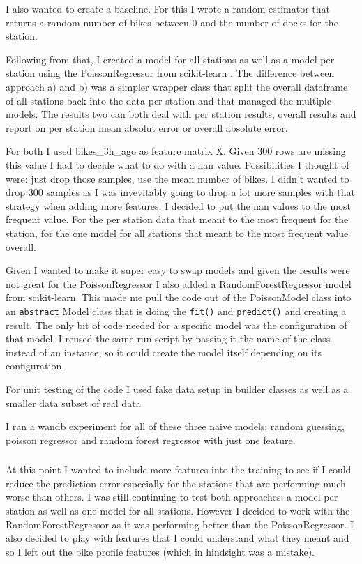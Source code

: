 \documentclass[a4paper]{article}
\begin{document}
    I also wanted to create a baseline. For this I wrote a random estimator that returns a random number of bikes between
    0 and the number of docks for the station.

    Following from that, I created a model for all stations as well as a model per station using the PoissonRegressor from
    scikit-learn \cite{scikit-learn}. The difference between approach a) and b) was a simpler wrapper class that split the
    overall dataframe of all stations back into the data per station and that managed the multiple models. The results
    two can both deal with per station results, overall results and report on per station mean absolut error or
    overall absolute error.

    For both I used bikes\_3h\_ago as feature matrix X. Given 300 rows are missing this value I had to decide what to do
    with a nan value. Possibilities I thought of were: just drop those samples, use the mean number of bikes. I didn't wanted
    to drop 300 samples as I was invevitably going to drop a lot more samples with that strategy when adding more features.
    I decided to put the nan values to the most frequent value. For the per station data that meant to the most frequent for
    the station, for the one model for all stations that meant to the most frequent value overall.

    Given I wanted to make it super easy to swap models and given the results were not great for the PoissonRegressor
    I also added a RandomForestRegressor model from scikit-learn. This made me pull the code out of the PoissonModel class
    into an \texttt{abstract} Model class that is doing the \texttt{fit()} and \texttt{predict()} and creating a result.
    The only bit of code needed for a specific model was the configuration of that model. I reused the same run script
    by passing it the name of the class instead of an instance, so it could create the model itself depending on its configuration.

    For unit testing of the code I used fake data setup in builder classes as well as a smaller data subset of real data.

    I ran a wandb experiment for all of these three naive models: random guessing, poisson regressor and random forest
    regressor with just one feature.

    \subsubsection*{}
    At this point I wanted to include more features into the training to see if I could reduce the prediction error
    especially for the stations that are performing much worse than others. I was still continuing to test both approaches:
    a model per station as well as one model for all stations. However I decided to work with the RandomForestRegressor
    as it was performing better than the PoissonRegressor. I also decided to play with features that I could understand
    what they meant and so I left out the bike profile features (which in hindsight was a mistake).
\end{document}
